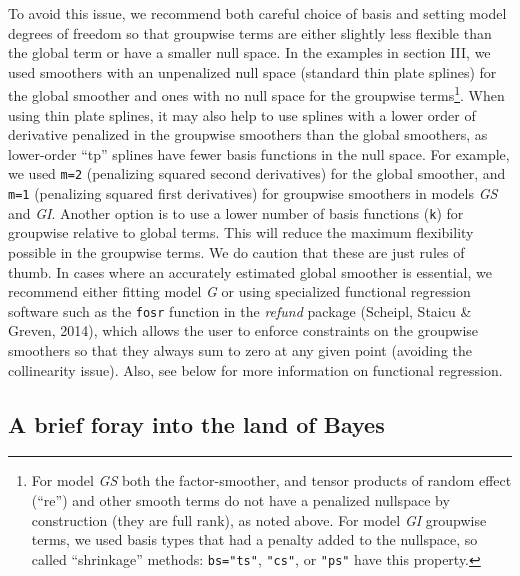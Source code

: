 \documentclass[12pt]{article}
\let\rmarkdownfootnote\footnote%
\def\footnote{\protect\rmarkdownfootnote}
\begin{document}
To avoid this issue, we recommend both careful choice of basis and
setting model degrees of freedom so that groupwise terms are either
slightly less flexible than the global term or have a smaller null
space. In the examples in section III, we used smoothers with an
unpenalized null space (standard thin plate splines) for the global
smoother and ones with no null space for the groupwise terms\footnote{For
  model \emph{GS} both the factor-smoother, and tensor products of
  random effect (``re'') and other smooth terms do not have a penalized
  nullspace by construction (they are full rank), as noted above. For
  model \emph{GI} groupwise terms, we used basis types that had a
  penalty added to the nullspace, so called ``shrinkage'' methods:
  \texttt{bs="ts"}, \texttt{"cs"}, or \texttt{"ps"} have this property.}.
When using thin plate splines, it may also help to use splines with a
lower order of derivative penalized in the groupwise smoothers than the
global smoothers, as lower-order ``tp'' splines have fewer basis
functions in the null space. For example, we used \texttt{m=2}
(penalizing squared second derivatives) for the global smoother, and
\texttt{m=1} (penalizing squared first derivatives) for groupwise
smoothers in models \emph{GS} and \emph{GI}. Another option is to use a
lower number of basis functions (\texttt{k}) for groupwise relative to
global terms. This will reduce the maximum flexibility possible in the
groupwise terms. We do caution that these are just rules of thumb. In
cases where an accurately estimated global smoother is essential, we
recommend either fitting model \emph{G} or using specialized functional
regression software such as the \texttt{fosr} function in the
\emph{refund} package (Scheipl, Staicu \& Greven, 2014), which allows
the user to enforce constraints on the groupwise smoothers so that they
always sum to zero at any given point (avoiding the collinearity issue).
Also, see below for more information on functional regression.

\subsection{A brief foray into the land of
Bayes}\label{a-brief-foray-into-the-land-of-bayes}
\end{document}
